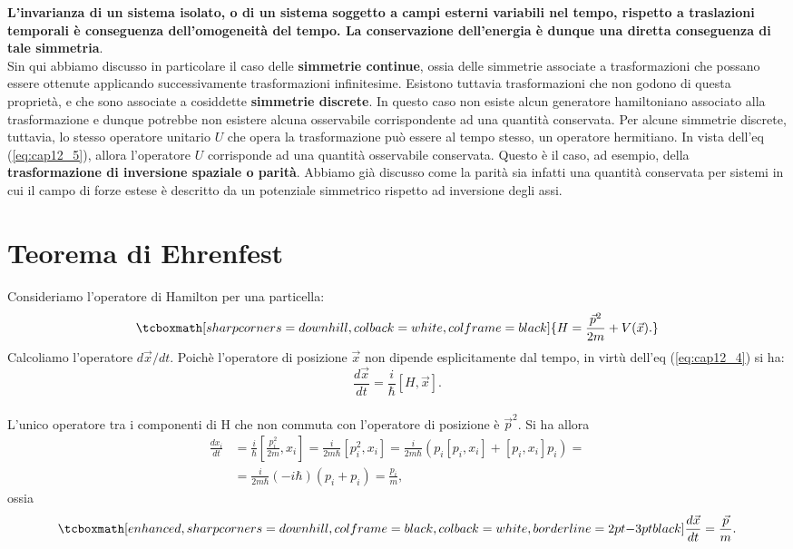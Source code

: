 \textbf{L'invarianza di un sistema isolato, o di un sistema soggetto a campi esterni variabili nel tempo, rispetto a traslazioni temporali è conseguenza dell'omogeneità del tempo. La conservazione dell'energia è dunque una diretta conseguenza di tale simmetria}.\\

Sin qui abbiamo discusso in particolare il caso delle \textbf{simmetrie continue}, ossia delle simmetrie associate a trasformazioni che possano essere ottenute applicando successivamente trasformazioni infinitesime.
Esistono tuttavia trasformazioni che non godono di questa proprietà, e che sono associate a cosiddette \textbf{simmetrie discrete}. In questo caso non esiste alcun generatore hamiltoniano associato alla trasformazione e dunque potrebbe non esistere alcuna osservabile corrispondente ad una quantità conservata. Per alcune simmetrie discrete, tuttavia, lo stesso operatore unitario $U$ che opera la trasformazione può essere al tempo stesso, un operatore hermitiano. In vista dell'eq (\ref{eq:cap12_5}), allora l'operatore $U$ corrisponde ad una quantità osservabile conservata. Questo è il caso, ad esempio, della \textbf{trasformazione di inversione spaziale o parità}. Abbiamo già discusso come la parità sia infatti una quantità conservata per sistemi in cui il campo di forze estese è descritto da un potenziale simmetrico rispetto ad inversione degli assi.

\section[Teorema di Ehrenfest]{Teorema di Ehrenfest}
Consideriamo l'operatore di Hamilton per una particella:
	\begin{equation}
		\tcboxmath[sharp corners=downhill, colback=white, colframe=black]{
			H= \frac{\vec{p}^2}{2m} + {V}(\vec{x}).
			}
	\end{equation}
Calcoliamo l'operatore $d\vec{x}/dt$. Poichè l'operatore di posizione $\vec{x}$ non dipende esplicitamente dal tempo, in virtù dell'eq (\ref{eq:cap12_4}) si ha:
	\begin{equation}
		\frac{d\vec{x}}{dt}= \frac{i}{\hbar}[H,\vec{x}].
	\end{equation}\\

L'unico operatore tra i componenti di H che non commuta con l'operatore di posizione è $\vec{p}^2$. Si ha allora 
	\begin{align}
		\frac{dx_i}{dt}&=\frac{i}{\hbar} \left[ \frac{p_i^2}{2m},x_i \right]= \frac{i}{2m\hbar}\left[ p_i ^2 ,x_i \right] = \frac{i}{2m\hbar}\left(p_i\left[ p_i, x_i\right]+\left[p_i , x_i \right]p_i\right)= \nonumber \\
		&= \frac{i}{2m\hbar }\left( -i\hbar \right) \left( p_i +p_i \right)=\frac{p_i}{m},
	\end{align}
ossia
	\begin{equation}
   	\label{eq:cap12_6}
		\tcboxmath[enhanced, sharp corners=downhill, colframe=black, colback=white, borderline={2pt}{-3pt}{black}]{
			\frac{d\vec{x}}{dt}=\frac{\vec{p}}{m}.
			}
	\end{equation}\\
	
